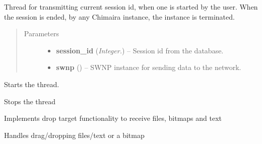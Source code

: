 \documentclass[letterpaper,10pt,english]{sphinxmanual}
\begin{document}

\begin{fulllineitems}
\label{api:wos.CURRENT_SESSION}
Thread for transmitting current session id, when one is started by the user.  When the session is ended, by any Chimaira instance, the instance is terminated.
\begin{quote}\begin{description}
\item[{Parameters}] \leavevmode\begin{itemize}
\item {} 
\textbf{session\_id} (\emph{Integer.}) -- Session id from the database.

\item {} 
\textbf{swnp} ({\hyperref[api:swnp.SWNP]{}}) -- SWNP instance for sending data to the network.

\end{itemize}

\end{description}\end{quote}

\begin{fulllineitems}
\label{api:wos.CURRENT_SESSION.run}
Starts the thread.

\end{fulllineitems}


\begin{fulllineitems}
\label{api:wos.CURRENT_SESSION.stop}
Stops the thread

\end{fulllineitems}


\end{fulllineitems}


\begin{fulllineitems}
\label{api:wos.DropTarget}
Implements drop target functionality to receive files, bitmaps and text

\begin{fulllineitems}
\label{api:wos.DropTarget.OnData}
Handles drag/dropping files/text or a bitmap

\end{fulllineitems}


\end{fulllineitems}
\end{document}
